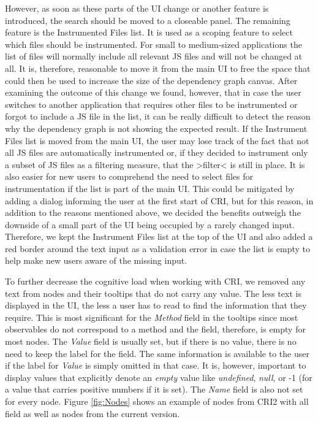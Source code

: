  However, as soon as these parts of the UI change or another feature is introduced, the search should be moved to a closeable panel. The remaining feature is the Instrumented Files list. It is used as a scoping feature to select which files should be instrumented. For small to medium-sized applications the list of files will normally include all relevant JS files and will not be changed at all. It is, therefore, reasonable to move it from the main UI to free the space that could then be used to increase the size of the dependency graph canvas. After examining the outcome of this change we found, however, that in case the user switches to another application that requires other files to be instrumented or forgot to include a JS file in the list, it can be really difficult to detect the reason why the dependency graph is not showing the expected result. If the Instrument Files list is moved from the main UI, the user may lose track of the fact that not all JS files are automatically instrumented or, if they decided to instrument only a subset of JS files as a filtering measure, that the >filter< is still in place. It is also easier for new users to comprehend the need to select files for instrumentation if the list is part of the main UI. This could be mitigated by adding a dialog informing the user at the first start of CRI, but for this reason, in addition to the reasons mentioned above, we decided the benefits outweigh the downside of a small part of the UI being occupied by a rarely changed input. Therefore, we kept the Instrument Files list at the top of the UI and also added a red border around the text input as a validation error in case the list is empty to help make new users aware of the missing input.

To further decrease the cognitive load when working with CRI, we removed any text from nodes and their tooltips that do not carry any value. The less text is displayed in the UI, the less a user has to read to find the information that they require.%
 This is most significant for the \emph{Method} field in the tooltips since most observables do not correspond to a method and the field, therefore, is empty for most nodes. The \emph{Value} field is usually set, but if there is no value, there is no need to keep the label for the field. The same information is available to the user if the label for \emph{Value} is simply omitted in that case.
It is, however, important to display values that explicitly denote an \emph{empty} value like \emph{undefined}, \emph{null}, or -1 (for a value that carries positive numbers if it is set). The \emph{Name} field is also not set for every node. Figure \ref{fig:Nodes} shows an example of nodes from CRI2 with all field as well as nodes from the current version.

